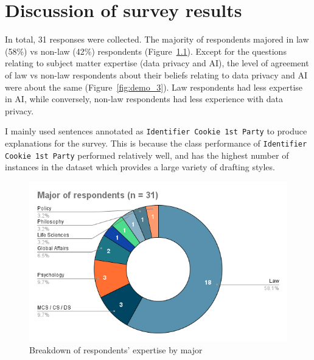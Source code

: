 \chapter{Discussion of survey results}
\label{chapter4}

In total, 31 responses were collected. The majority of respondents majored in law (58\%) vs non-law (42\%) respondents (Figure~\ref{fig:demo_1}). Except for the questions relating to subject matter expertise (data privacy and AI), the level of agreement of law vs non-law respondents about their beliefs relating to data privacy and AI were about the same (Figure~\ref{fig:demo_3}). Law respondents had less expertise in AI, while conversely, non-law respondents had less experience with data privacy. 

I mainly used sentences annotated as \texttt{Identifier Cookie 1st Party} to produce explanations for the survey. This is because the class performance of \texttt{Identifier Cookie 1st Party} performed relatively well, and has the highest number of instances in the dataset which provides a large variety of drafting styles.

\begin{figure}[!ht]
  \centering
  \includegraphics[width=0.85\linewidth]{figures/major_respondents.png}
  \caption{Breakdown of respondents' expertise by major}
  \label{fig:demo_1}
\end{figure}

